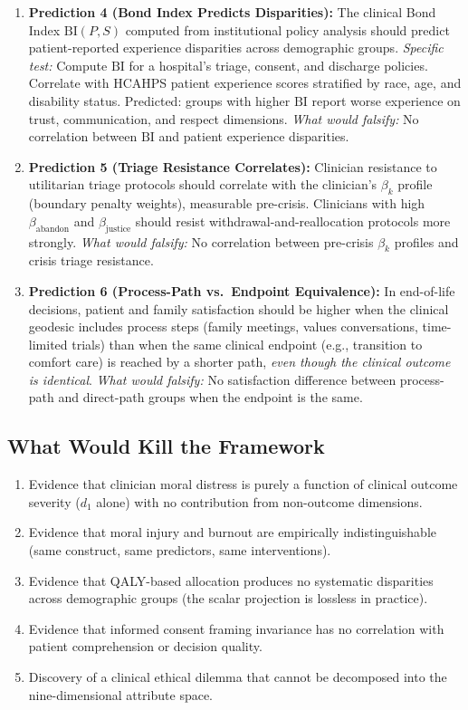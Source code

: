 \documentclass[12pt]{article}
\theoremstyle{definition}
\theoremstyle{remark}
\newcommand{\BI}{\mathrm{BI}}              %
\begin{document}
\begin{enumerate}
    \item \textbf{Prediction 4 (Bond Index Predicts Disparities):} The clinical Bond Index $\BI(P, S)$ computed from institutional policy analysis should predict patient-reported experience disparities across demographic groups.  \emph{Specific test:} Compute $\BI$ for a hospital's triage, consent, and discharge policies.  Correlate with HCAHPS patient experience scores stratified by race, age, and disability status.  Predicted: groups with higher $\BI$ report worse experience on trust, communication, and respect dimensions.  \emph{What would falsify:} No correlation between $\BI$ and patient experience disparities.

    \item \textbf{Prediction 5 (Triage Resistance Correlates):} Clinician resistance to utilitarian triage protocols should correlate with the clinician's $\beta_k$ profile (boundary penalty weights), measurable pre-crisis.  Clinicians with high $\beta_{\text{abandon}}$ and $\beta_{\text{justice}}$ should resist withdrawal-and-reallocation protocols more strongly.  \emph{What would falsify:} No correlation between pre-crisis $\beta_k$ profiles and crisis triage resistance.

    \item \textbf{Prediction 6 (Process-Path vs.\ Endpoint Equivalence):} In end-of-life decisions, patient and family satisfaction should be higher when the clinical geodesic includes process steps (family meetings, values conversations, time-limited trials) than when the same clinical endpoint (e.g., transition to comfort care) is reached by a shorter path, \emph{even though the clinical outcome is identical}.  \emph{What would falsify:} No satisfaction difference between process-path and direct-path groups when the endpoint is the same.
\end{enumerate}

\subsection{What Would Kill the Framework}

\begin{enumerate}
    \item Evidence that clinician moral distress is purely a function of clinical outcome severity ($d_1$ alone) with no contribution from non-outcome dimensions.
    \item Evidence that moral injury and burnout are empirically indistinguishable (same construct, same predictors, same interventions).
    \item Evidence that QALY-based allocation produces no systematic disparities across demographic groups (the scalar projection is lossless in practice).
    \item Evidence that informed consent framing invariance has no correlation with patient comprehension or decision quality.
    \item Discovery of a clinical ethical dilemma that cannot be decomposed into the nine-dimensional attribute space.
\end{enumerate}
\end{document}
